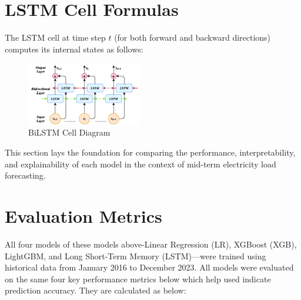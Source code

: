 \documentclass{ifacconf}
\begin{document}
\section*{LSTM Cell Formulas}

The LSTM cell at time step $t$ (for both forward and backward directions) computes its internal states as follows:
\begin{figure}[h]
  \centering
  \includegraphics[width=0.45\textwidth]{bidrectionallstm.png}
  \caption{BiLSTM Cell Diagram}
  \label{fig:bilstm}
\end{figure}

This section lays the foundation for comparing the performance, interpretability, and explainability of each model in the context of mid-term electricity load forecasting.



\section{Evaluation Metrics}

All four models of these models above-Linear Regression (LR), XGBoost (XGB), LightGBM, and Long Short-Term Memory (LSTM)—were trained using historical data from January 2016 to December 2023. All models were evaluated on the same four key performance metrics below which help used indicate prediction accuracy. They are calculated as below:
\end{document}
